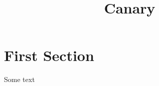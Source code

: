 \documentclass[11pt,twocolumn]{article}
\title{Canary}
\begin{document}
\maketitle

\section{First Section}
Some text


\nocite*{}
\end{document}
